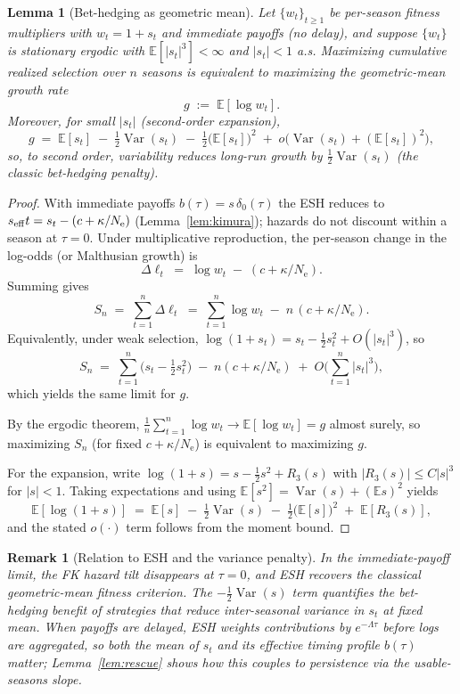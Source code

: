 \documentclass[11pt]{article}
\theoremstyle{upright}
\newtheorem{lemma}{Lemma}
\newtheorem{remark}{Remark}
\newcommand{\Var}{\operatorname{Var}}
\newcommand{\Ne}{N_{\mathrm{e}}}
\newcommand{\seff}[1][]{s_{\mathrm{eff}\if\relax\detokenize{#1}\relax\else,#1\fi}}
\begin{document}
\begin{lemma}[Bet-hedging as geometric mean]\label{lem:bet}
Let $\{w_t\}_{t\ge 1}$ be per-season fitness multipliers with $w_t=1+s_t$ and immediate payoffs (no delay), and suppose $\{w_t\}$ is stationary ergodic with $\mathbb E[|s_t|^3]<\infty$ and $|s_t|<1$ a.s.
Maximizing cumulative realized selection over $n$ seasons is equivalent to maximizing the geometric-mean growth rate
\[
g \;:=\; \mathbb E[\log w_t].
\]
Moreover, for small $|s_t|$ (second-order expansion),
\[
g \;=\; \mathbb E[s_t] \;-\; \tfrac12 \Var(s_t) \;-\; \tfrac12 \big(\mathbb E[s_t]\big)^2 \;+\; o\!\big(\Var(s_t)+(\mathbb E[s_t])^2\big),
\]
so, to second order, variability reduces long-run growth by $\tfrac12\Var(s_t)$ (the classic bet-hedging penalty).
\end{lemma}

\begin{proof}
With immediate payoffs $b(\tau)=s\,\delta_0(\tau)$ the ESH reduces to $\seff{t}=s_t-(c+\kappa/\Ne)$ (Lemma~\ref{lem:kimura}); hazards do not discount within a season at $\tau=0$. Under multiplicative reproduction, the per-season change in the log-odds (or Malthusian growth) is
\[
\Delta \ell_t \;=\; \log w_t \;-\; (c+\kappa/\Ne).
\]
Summing gives
\[
S_n \;=\; \sum_{t=1}^n \Delta \ell_t \;=\; \sum_{t=1}^n \log w_t \;-\; n\,(c+\kappa/\Ne).
\]
Equivalently, under weak selection, $\log(1+s_t)= s_t - \tfrac12 s_t^2 + O(|s_t|^3)$, so
\[
S_n \;=\; \sum_{t=1}^n \!\Big(s_t - \tfrac12 s_t^2\Big) \;-\; n(c+\kappa/\Ne) \;+\; O\!\Big(\sum_{t=1}^n |s_t|^3\Big),
\]
which yields the same limit for $g$.

By the ergodic theorem, $\frac1n\sum_{t=1}^n \log w_t \to \mathbb E[\log w_t]=g$ almost surely, so maximizing $S_n$ (for fixed $c+\kappa/\Ne$) is equivalent to maximizing $g$.

For the expansion, write $\log(1+s)= s - \tfrac12 s^2 + R_3(s)$ with $|R_3(s)|\le C|s|^3$ for $|s|<1$.
Taking expectations and using $\mathbb E[s^2]=\Var(s)+(\mathbb E s)^2$ yields
\[
\mathbb E[\log(1+s)] \;=\; \mathbb E[s] \;-\; \tfrac12 \Var(s) \;-\; \tfrac12\big(\mathbb E[s]\big)^2 \;+\; \mathbb E[R_3(s)],
\]
and the stated $o(\cdot)$ term follows from the moment bound.
\end{proof}

\begin{remark}[Relation to ESH and the variance penalty]
In the immediate-payoff limit, the FK hazard tilt disappears at $\tau=0$, and ESH recovers the classical \emph{geometric-mean fitness} criterion.
The $-\tfrac12\Var(s)$ term quantifies the bet-hedging benefit of strategies that reduce inter-seasonal variance in $s_t$ at fixed mean.
When payoffs are \emph{delayed}, ESH weights contributions by $e^{-\Lambda \tau}$ before logs are aggregated, so both the mean of $s_t$ and its effective timing profile $b(\tau)$ matter; Lemma~\ref{lem:rescue} shows how this couples to persistence via the usable-seasons slope.
\end{remark}
\end{document}
